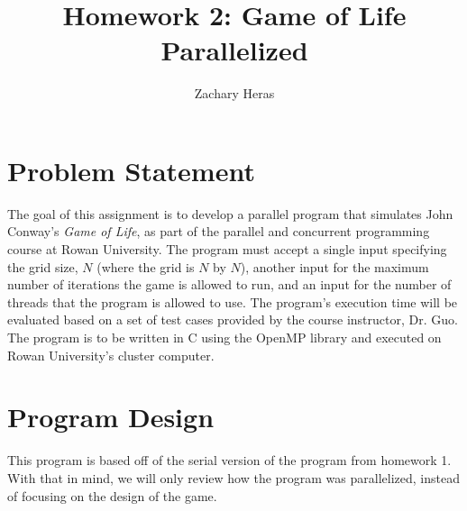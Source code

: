 \documentclass{article}
\title{Homework 2: Game of Life Parallelized}
\author{Zachary Heras}
\begin{document}
	\maketitle
	
	\section{Problem Statement}
	The goal of this assignment is to develop a parallel program that simulates John Conway's \textit{Game of Life}, as part of the parallel and concurrent programming course at Rowan University. The program must accept a single input specifying the grid size, \(N\) (where the grid is \(N\) by \(N\)), another input for the maximum number of iterations the game is allowed to run, and an input for the number of threads that the program is allowed to use. The program's execution time will be evaluated based on a set of test cases provided by the course instructor, Dr. Guo. The program is to be written in C using the OpenMP library and executed on Rowan University's cluster computer.

	\section{Program Design}
	This program is based off of the serial version of the program from homework 1. With that in mind, we will only review how the program was parallelized, instead of focusing on the design of the game.
	
\end{document}
